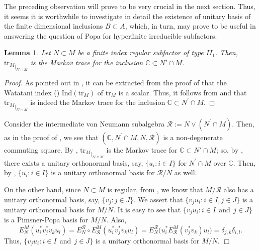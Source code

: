 \documentclass{amsart}
\newtheorem{lemma}[theorem]{Lemma}
\theoremstyle{definition}
\theoremstyle{theorem}
\newcommand{\C}{\mathbb{C}}
\newcommand{\tr}{\mathrm{tr}}
\begin{document}
 
The preceding observation will prove to be very crucial in the next
section. Thus, it seems it is worthwhile
to investigate in detail the existence of unitary basis of the finite
dimensional inclusions $B\subset A$, which, in turn, may prove to be
useful in answering the question of Popa for hyperfinite irreducible
subfactors.


\begin{lemma}\label{markov}
Let $N \subset M$ be a finite index regular subfactor of type
$II_1$. Then, ${\tr_M}_{|_{N'\cap M}}$ is the Markov trace for the
inclusion $\C \subset N'\cap M$.
  \end{lemma}

\begin{proof} 
 As pointed out in ,  it can be extracted from the proof of
 \cite[Theorem 3.12]{BG} that the Watatani index
 (\cite{W}) $\text{Ind}(\tr_M)$ of $\tr_M$ is a scalar. Thus, it follows from
 \cite[Corollary 2.4.3]{W} and \cite[Proposition 3.2.3]{JS} that
 ${\tr_M}_{|_{N'\cap M}}$ is indeed the Markov trace for the inclusion
 $\C\subset N^{\prime}\cap M$.
\end{proof}  
\smallskip


 Consider the
intermediate von Neumann subalgebra $\mathcal{R}:=N\vee
(N^{\prime}\cap M)$. Then, as in the proof of \cite[Lemma 3.4]{BG}, we
see that $(\C,N^{\prime}\cap M, N,\mathcal{R})$ is a non-degenerate
commuting square.  By , ${\tr_M}_{|_{N'\cap M}}$ is the Markov
trace for $\C \subset N'\cap M$; so, by , there
exists a unitary orthonormal basis, say, $\{u_i:i\in I\}$ for
$N^{\prime}\cap M$ over $\C$.  Then, by , $\{ u_i :
i \in I\}$ is a unitary orthonormal basis for $\mathcal{R}/N$ as well.

On the other hand, since $N \subset M$ is regular, from
\cite[Proposition 3.7]{BG}, we know that $M/\mathcal{R}$ also has a
unitary orthonormal basis, say, $\{v_j:j\in J\}$. We assert that
$\{v_ju_i:i\in I, j\in J\}$ is a unitary orthonormal basis for
$M/N$. It is easy to see that $\{v_ju_i:i\in I~~\text{and}~~j\in J\}$
is a Pimsner-Popa basis for $M/N$. Also,
$$
E^M_N(u^*_i v_j^*v_ku_l)=E^{\mathcal{R}}_N\circ
E^M_{\mathcal{R}}(u^*_iv_j^*v_ku_l)=
E^{\mathcal{R}}_N\big(u^*_iE^M_{\mathcal{R}}(v^*_jv_k)u_l\big)=\delta_{j,k}\delta_{i,l}.
$$
Thus, $\{v_ju_i:i\in I~~\text{and}~~j\in J\}$ is a unitary
orthonormal basis for $M/N$.  \hfill $\Box$
\end{document}

